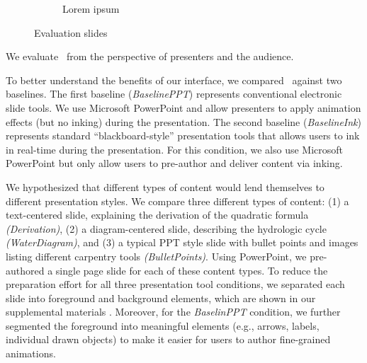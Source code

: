 \begin{figure}[t!]
\begin{subfigure}[t]{0.48\columnwidth}
        \caption{Lorem ipsum}
    \end{subfigure}  
    \caption{Evaluation slides}
\end{figure}

We evaluate \interface\ from the perspective of presenters and the audience.


To better understand the benefits of our interface, we compared \interface\ against two baselines. The first baseline (\textit{BaselinePPT}) represents conventional electronic slide tools.
%
We use Microsoft PowerPoint and allow presenters to apply animation effects (but no inking) during the presentation.
%
The second baseline (\textit{BaselineInk}) represents standard ``blackboard-style'' presentation tools that allows users to ink in real-time during the presentation.
%
For this condition, we also use Microsoft PowerPoint but only allow users to pre-author and deliver content via inking.

We hypothesized that different types of content would lend themselves to different presentation styles. We compare three different types of content: (1) a text-centered slide, explaining the derivation of the quadratic formula \textit{(Derivation)}, (2) a diagram-centered slide, describing the hydrologic cycle  \textit{(WaterDiagram)}, and (3) a typical PPT style slide with bullet points and images listing different carpentry tools \textit{(BulletPoints)}. Using PowerPoint, we pre-authored a single page slide for each of these content types. 
%
To reduce the preparation effort for all three presentation tool conditions, we separated each slide into foreground and background elements, which are shown in our supplemental materials . Moreover, for the \textit{BaselinPPT} condition, we further segmented the foreground into meaningful elements (e.g., arrows, labels, individual drawn objects) to make it easier for users to author fine-grained animations. 
%

